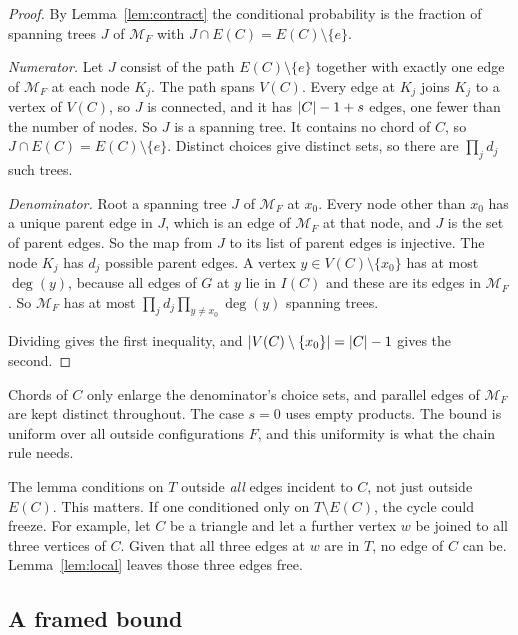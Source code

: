 \begin{proof}
By Lemma~\ref{lem:contract} the conditional probability is the fraction of spanning trees $J$ of $\mathcal M_F$ with $J\cap E(C)=E(C)\setminus\{e\}$.

\emph{Numerator.} Let $J$ consist of the path $E(C)\setminus\{e\}$ together with exactly one edge of $\mathcal M_F$ at each node $K_j$. The path spans $V(C)$. Every edge at $K_j$ joins $K_j$ to a vertex of $V(C)$, so $J$ is connected, and it has $\lvert C\rvert-1+s$ edges, one fewer than the number of nodes. So $J$ is a spanning tree. It contains no chord of $C$, so $J\cap E(C)=E(C)\setminus\{e\}$. Distinct choices give distinct sets, so there are $\prod_jd_j$ such trees.

\emph{Denominator.} Root a spanning tree $J$ of $\mathcal M_F$ at $x_0$. Every node other than $x_0$ has a unique parent edge in $J$, which is an edge of $\mathcal M_F$ at that node, and $J$ is the set of parent edges. So the map from $J$ to its list of parent edges is injective. The node $K_j$ has $d_j$ possible parent edges. A vertex $y\in V(C)\setminus\{x_0\}$ has at most $\deg(y)$, because all edges of $G$ at $y$ lie in $I(C)$ and these are its edges in $\mathcal M_F$. So $\mathcal M_F$ has at most $\prod_jd_j\prod_{y\ne x_0}\deg(y)$ spanning trees.

Dividing gives the first inequality, and $\lvert V(C)\setminus\{x_0\}\rvert=\lvert C\rvert-1$ gives the second.
\end{proof}

Chords of $C$ only enlarge the denominator's choice sets, and parallel edges of $\mathcal M_F$ are kept distinct throughout. The case $s=0$ uses empty products. The bound is uniform over all outside configurations $F$, and this uniformity is what the chain rule needs.

\begin{remark}
The lemma conditions on $T$ outside \emph{all} edges incident to $C$, not just outside $E(C)$. This matters. If one conditioned only on $T\setminus E(C)$, the cycle could freeze. For example, let $C$ be a triangle and let a further vertex $w$ be joined to all three vertices of $C$. Given that all three edges at $w$ are in $T$, no edge of $C$ can be. Lemma~\ref{lem:local} leaves those three edges free.
\end{remark}

\subsection{A framed bound}

